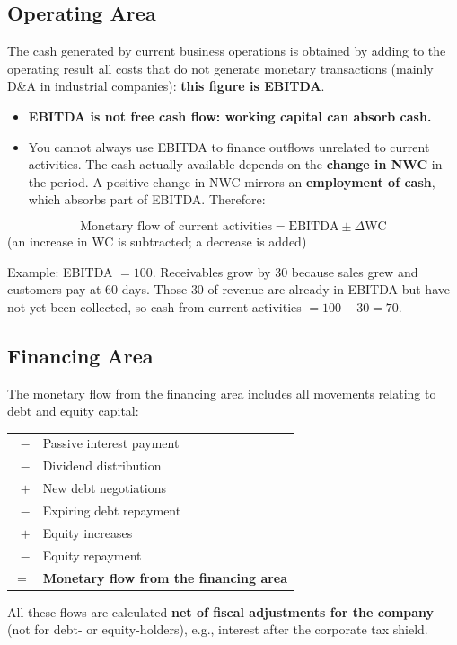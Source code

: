 \subsection[Operating Area]{Operating Area }

The cash generated by current business operations is obtained by adding to the operating result all costs that do not generate monetary transactions (mainly D\&A in industrial companies): \textbf{this figure is EBITDA}.

\begin{itemize}
  \item \textbf{EBITDA is not free cash flow: working capital can absorb cash.}
  \item You cannot always use EBITDA to finance outflows unrelated to current activities. The cash actually available depends on the \textbf{change in NWC} in the period. A positive change in NWC mirrors an \textbf{employment of cash}, which absorbs part of EBITDA. Therefore:
\end{itemize}
\begin{keybox}
\[
\text{Monetary flow of current activities} = \text{EBITDA} \pm \Delta \text{WC}
\]
(an increase in WC is subtracted; a decrease is added)
\end{keybox}

\begin{addbox}
Example: EBITDA $=100$. Receivables grow by $30$ because sales grew and customers pay at 60 days. Those $30$ of revenue are already in EBITDA but have not yet been collected, so cash from current activities $=100-30=70$.
\end{addbox}

\subsection[Financing Area]{Financing Area }

The monetary flow from the financing area includes all movements relating to debt and equity capital:
\begin{center}
\begin{tabular}{@{}rl@{}}
$-$ & Passive interest payment\\
$-$ & Dividend distribution\\
$+$ & New debt negotiations\\
$-$ & Expiring debt repayment\\
$+$ & Equity increases\\
$-$ & Equity repayment\\
\midrule
$=$ & \textbf{Monetary flow from the financing area}
\end{tabular}
\end{center}
All these flows are calculated \textbf{net of fiscal adjustments for the company} (not for debt- or equity-holders), e.g., interest after the corporate tax shield.

